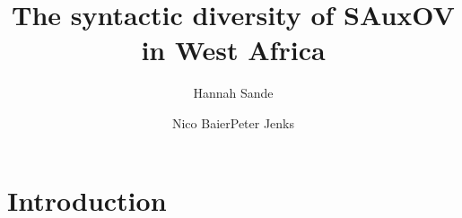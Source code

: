 \documentclass[output=paper]{LSP/langsci}
\author{Hannah Sande\affiliation{Georgetown University}\and Nico Baier\affiliation{McGill University}\lastand Peter Jenks\affiliation{UC Berkeley}}
\title{The syntactic diversity of SAuxOV in West Africa}
\begin{document}
\maketitle

\section{Introduction} 
 
%
%
%
%
%

\end{document}
